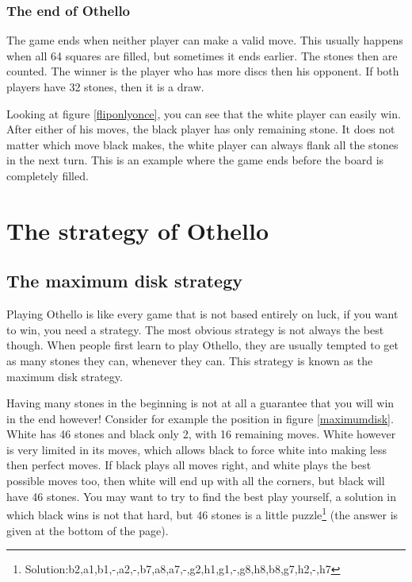 \documentclass[12pt,twoside]{report}
\newcommand{\clearemptydoublepage}{\newpage{\pagestyle{empty}\cleardoublepage}}
\begin{document}
\subsection{The end of Othello}
The game ends when neither player can  make a valid move. This  usually happens
when all 64 squares are filled, but
sometimes it ends earlier. The stones then are counted. The winner is the player who has more discs
then his opponent. If both players have 32 stones, then it is a draw.

Looking at figure \ref{fliponlyonce}, you can see that the white
player can easily win. After either of his moves, the black player
has only remaining stone. It does not matter which move black
makes, the white player can always flank all the stones in the
next turn. This is an example where the game ends before the board
is completely filled.

\clearemptydoublepage
\chapter{The strategy of Othello}
\section{The maximum disk strategy}
Playing Othello is like every game that is not based entirely on luck, if you want
to win, you need a strategy. The most obvious strategy is not always the best
though. When people first learn to play Othello, they are usually tempted to get
as many stones they can, whenever they can.
This strategy is known as the maximum disk strategy.
\begin{floatingfigure}{4cm}
\maximumdisk
\end{floatingfigure}
Having many stones in the beginning is
not at all a guarantee that you will win in the end however! Consider for example
the position in figure \ref{maximumdisk}.
White has 46 stones and black only 2, with 16 remaining moves.
White however is very limited in its moves, which allows black to
force white into making less then perfect moves. If black plays
all moves right, and white plays the best possible moves too, then
white will end up with all the corners, but black will have 46
stones. You may want to try to find the best play yourself, a
solution in which black wins is not that hard, but 46 stones is a
little
puzzle\footnote{Solution:b2,a1,b1,-,a2,-,b7,a8,a7,-,g2,h1,g1,-,g8,h8,b8,g7,h2,-,h7}
(the answer is given at the bottom of the page).
\end{document}
